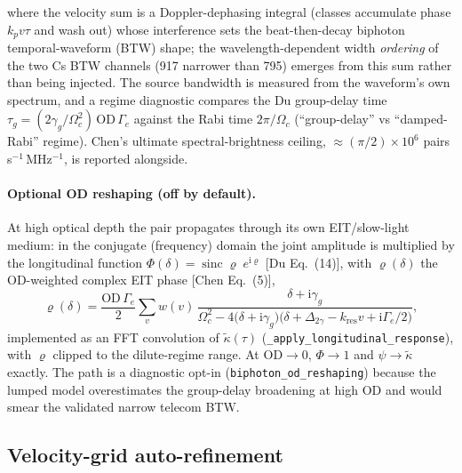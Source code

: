 \documentclass[11pt]{article}
\newcommand{\ii}{\mathrm{i}}
\newcommand{\sinc}{\operatorname{sinc}}
\newcommand{\code}[1]{\texttt{#1}}
\begin{document}
where the velocity sum is a Doppler-dephasing integral (classes accumulate
phase $k_p v\tau$ and wash out) whose interference sets the beat-then-decay
biphoton temporal-waveform (BTW) shape; the wavelength-dependent width
\emph{ordering} of the two Cs BTW channels (917 narrower than 795) emerges from
this sum rather than being injected. The source bandwidth is measured from the
waveform's own spectrum, and a regime diagnostic compares the Du group-delay
time $\tau_g=(2\gamma_g/\Omega_c^2)\,\mathrm{OD}\,\Gamma_e$ against the Rabi
time $2\pi/\Omega_c$ (``group-delay'' vs ``damped-Rabi'' regime). Chen's
ultimate spectral-brightness ceiling, $\approx(\pi/2)\times10^{6}$
pairs\,s$^{-1}$\,MHz$^{-1}$, is reported alongside.

\paragraph{Optional OD reshaping (off by default).} At high optical depth the
pair propagates through its own EIT/slow-light medium: in the conjugate
(frequency) domain the joint amplitude is multiplied by the longitudinal
function $\Phi(\delta)=\sinc\varrho\;e^{\ii\varrho}$ [Du Eq.~(14)], with
$\varrho(\delta)$ the OD-weighted complex EIT phase [Chen Eq.~(5)],
\begin{equation}
\varrho(\delta)=\frac{\mathrm{OD}\,\Gamma_e}{2}
\sum_v w(v)\,
\frac{\delta+\ii\gamma_g}
{\Omega_c^2-4\big(\delta+\ii\gamma_g\big)
 \big(\delta+\Delta_{2\gamma}-k_{\text{res}}v+\ii\Gamma_e/2\big)},
\label{eq:eitphase}
\end{equation}
implemented as an FFT convolution of $\tilde\kappa(\tau)$
(\code{\_apply\_longitudinal\_response}), with $\varrho$ clipped to the
dilute-regime range. At $\mathrm{OD}\to0$, $\Phi\to1$ and
$\psi\to\tilde\kappa$ exactly. The path is a diagnostic opt-in
(\code{biphoton\_od\_reshaping}) because the lumped model overestimates the
group-delay broadening at high OD and would smear the validated narrow telecom
BTW.

\subsection{Velocity-grid auto-refinement}
\label{sec:vrefine}
\end{document}
